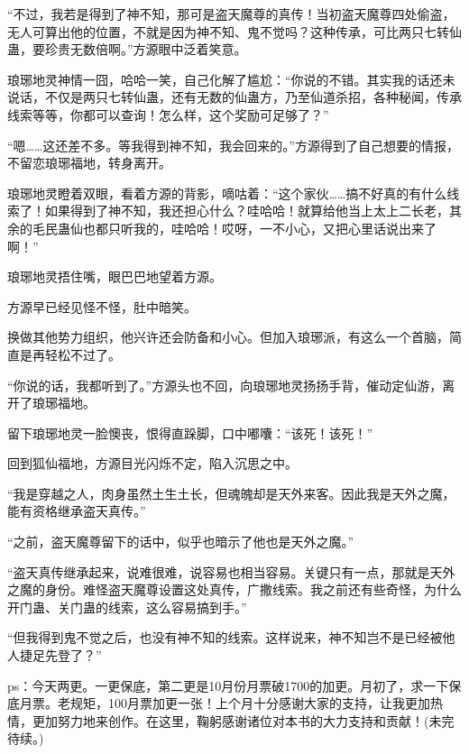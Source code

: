 \begin{this_body}
“不过，我若是得到了神不知，那可是盗天魔尊的真传！当初盗天魔尊四处偷盗，无人可算出他的位置，不就是因为神不知、鬼不觉吗？这种传承，可比两只七转仙蛊，要珍贵无数倍啊。”方源眼中泛着笑意。

琅琊地灵神情一囧，哈哈一笑，自己化解了尴尬：“你说的不错。其实我的话还未说话，不仅是两只七转仙蛊，还有无数的仙蛊方，乃至仙道杀招，各种秘闻，传承线索等等，你都可以查询！怎么样，这个奖励可足够了？”

“嗯……这还差不多。等我得到神不知，我会回来的。”方源得到了自己想要的情报，不留恋琅琊福地，转身离开。

琅琊地灵瞪着双眼，看着方源的背影，嘀咕着：“这个家伙……搞不好真的有什么线索了！如果得到了神不知，我还担心什么？哇哈哈！就算给他当上太上二长老，其余的毛民蛊仙也都只听我的，哇哈哈！哎呀，一不小心，又把心里话说出来了啊！”

琅琊地灵捂住嘴，眼巴巴地望着方源。

方源早已经见怪不怪，肚中暗笑。

换做其他势力组织，他兴许还会防备和小心。但加入琅琊派，有这么一个首脑，简直是再轻松不过了。

“你说的话，我都听到了。”方源头也不回，向琅琊地灵扬扬手背，催动定仙游，离开了琅琊福地。

留下琅琊地灵一脸懊丧，恨得直跺脚，口中嘟囔：“该死！该死！”

回到狐仙福地，方源目光闪烁不定，陷入沉思之中。

“我是穿越之人，肉身虽然土生土长，但魂魄却是天外来客。因此我是天外之魔，能有资格继承盗天真传。”

“之前，盗天魔尊留下的话中，似乎也暗示了他也是天外之魔。”

“盗天真传继承起来，说难很难，说容易也相当容易。关键只有一点，那就是天外之魔的身份。难怪盗天魔尊设置这处真传，广撒线索。我之前还有些奇怪，为什么开门蛊、关门蛊的线索，这么容易搞到手。”

“但我得到鬼不觉之后，也没有神不知的线索。这样说来，神不知岂不是已经被他人捷足先登了？”

ps：今天两更。一更保底，第二更是10月份月票破1700的加更。月初了，求一下保底月票。老规矩，100月票加更一张！上个月十分感谢大家的支持，让我更加热情，更加努力地来创作。在这里，鞠躬感谢诸位对本书的大力支持和贡献！(未完待续。)

\end{this_body}


